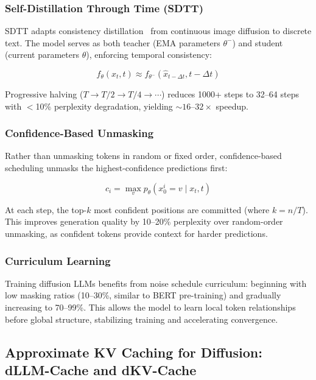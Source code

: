 \documentclass[11pt,letterpaper]{article}
\begin{document}
\subsubsection{Self-Distillation Through Time (SDTT)}

SDTT adapts consistency distillation~\cite{consistency-models} from continuous image diffusion to discrete text. The model serves as both teacher (EMA parameters $\theta^-$) and student (current parameters $\theta$), enforcing temporal consistency:

\begin{equation}
    f_\theta(x_t, t) \approx f_{\theta^-}(\hat{x}_{t-\Delta t}, t - \Delta t)
    \label{eq:sdtt}
\end{equation}

Progressive halving ($T \to T/2 \to T/4 \to \cdots$) reduces 1000+ steps to 32--64 steps with $<$10\% perplexity degradation, yielding ${\sim}16$--$32\times$ speedup.

\subsubsection{Confidence-Based Unmasking}

Rather than unmasking tokens in random or fixed order, confidence-based scheduling unmasks the highest-confidence predictions first:

\begin{equation}
    c_i = \max_v p_\theta(x_0^i = v \mid x_t, t)
    \label{eq:confidence}
\end{equation}

At each step, the top-$k$ most confident positions are committed (where $k = n/T$). This improves generation quality by 10--20\% perplexity over random-order unmasking, as confident tokens provide context for harder predictions.

\subsubsection{Curriculum Learning}

Training diffusion LLMs benefits from noise schedule curriculum: beginning with low masking ratios (10--30\%, similar to BERT pre-training) and gradually increasing to 70--99\%. This allows the model to learn local token relationships before global structure, stabilizing training and accelerating convergence.

\subsection{Approximate KV Caching for Diffusion: dLLM-Cache and dKV-Cache}
\end{document}

